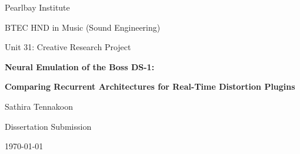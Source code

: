 \begin{titlepage}
  \centering
  {\Large Pearlbay Institute\par}
  \vspace{1.5cm}
  {\large BTEC HND in Music (Sound Engineering)\par}
  {\large Unit 31: Creative Research Project\par}
  \vfill
  {\huge \bfseries Neural Emulation of the Boss DS-1:}
  \vspace{0.12cm}
  {\huge \bfseries Comparing Recurrent Architectures for Real-Time Distortion Plugins\par}
  \vfill
  {\Large Sathira Tennakoon\par}
  \vspace{0.5cm}
  {\large Dissertation Submission\par}
  \vfill
  {\large \today\par}
\end{titlepage}
